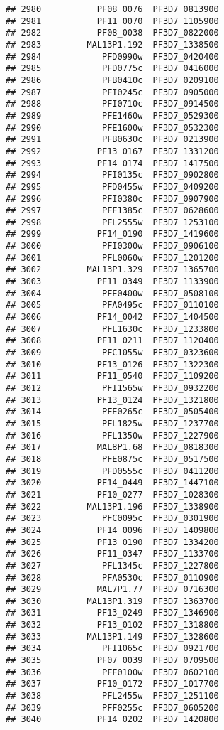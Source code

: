 \documentclass{article}\usepackage[]{graphicx}\usepackage[]{color}
\makeatletter
\newenvironment{kframe}{%
 \def\at@end@of@kframe{}%
 \ifinner\ifhmode%
  \def\at@end@of@kframe{\end{minipage}}%
  \begin{minipage}{\columnwidth}%
 \fi\fi%
 \def\FrameCommand##1{\hskip\@totalleftmargin \hskip-\fboxsep
 \colorbox{shadecolor}{##1}\hskip-\fboxsep
     \hskip-\linewidth \hskip-\@totalleftmargin \hskip\columnwidth}%
 \MakeFramed {\advance\hsize-\width
   \@totalleftmargin\z@ \linewidth\hsize
   \@setminipage}}%
 {\par\unskip\endMakeFramed%
 \at@end@of@kframe}
\newenvironment{knitrout}{}{} %
\makeatother
\begin{document}
\begin{knitrout}
\begin{kframe}
\begin{verbatim}
## 2980           PF08_0076  PF3D7_0813900
## 2981           PF11_0070  PF3D7_1105900
## 2982           PF08_0038  PF3D7_0822000
## 2983         MAL13P1.192  PF3D7_1338500
## 2984            PFD0990w  PF3D7_0420400
## 2985            PFD0775c  PF3D7_0416000
## 2986            PFB0410c  PF3D7_0209100
## 2987            PFI0245c  PF3D7_0905000
## 2988            PFI0710c  PF3D7_0914500
## 2989            PFE1460w  PF3D7_0529300
## 2990            PFE1600w  PF3D7_0532300
## 2991            PFB0630c  PF3D7_0213900
## 2992           PF13_0167  PF3D7_1331200
## 2993           PF14_0174  PF3D7_1417500
## 2994            PFI0135c  PF3D7_0902800
## 2995            PFD0455w  PF3D7_0409200
## 2996            PFI0380c  PF3D7_0907900
## 2997            PFF1385c  PF3D7_0628600
## 2998            PFL2555w  PF3D7_1253100
## 2999           PF14_0190  PF3D7_1419600
## 3000            PFI0300w  PF3D7_0906100
## 3001            PFL0060w  PF3D7_1201200
## 3002         MAL13P1.329  PF3D7_1365700
## 3003           PF11_0349  PF3D7_1133900
## 3004            PFE0400w  PF3D7_0508100
## 3005            PFA0495c  PF3D7_0110100
## 3006           PF14_0042  PF3D7_1404500
## 3007            PFL1630c  PF3D7_1233800
## 3008           PF11_0211  PF3D7_1120400
## 3009            PFC1055w  PF3D7_0323600
## 3010           PF13_0126  PF3D7_1322300
## 3011           PF11_0540  PF3D7_1109200
## 3012            PFI1565w  PF3D7_0932200
## 3013           PF13_0124  PF3D7_1321800
## 3014            PFE0265c  PF3D7_0505400
## 3015            PFL1825w  PF3D7_1237700
## 3016            PFL1350w  PF3D7_1227900
## 3017           MAL8P1.68  PF3D7_0818300
## 3018            PFE0875c  PF3D7_0517500
## 3019            PFD0555c  PF3D7_0411200
## 3020           PF14_0449  PF3D7_1447100
## 3021           PF10_0277  PF3D7_1028300
## 3022         MAL13P1.196  PF3D7_1338900
## 3023            PFC0095c  PF3D7_0301900
## 3024           PF14_0096  PF3D7_1409800
## 3025           PF13_0190  PF3D7_1334200
## 3026           PF11_0347  PF3D7_1133700
## 3027            PFL1345c  PF3D7_1227800
## 3028            PFA0530c  PF3D7_0110900
## 3029           MAL7P1.77  PF3D7_0716300
## 3030         MAL13P1.319  PF3D7_1363700
## 3031           PF13_0249  PF3D7_1346900
## 3032           PF13_0102  PF3D7_1318800
## 3033         MAL13P1.149  PF3D7_1328600
## 3034            PFI1065c  PF3D7_0921700
## 3035           PF07_0039  PF3D7_0709500
## 3036            PFF0100w  PF3D7_0602100
## 3037           PF10_0172  PF3D7_1017700
## 3038            PFL2455w  PF3D7_1251100
## 3039            PFF0255c  PF3D7_0605200
## 3040           PF14_0202  PF3D7_1420800

\end{verbatim}
\end{kframe}
\end{knitrout}
\end{document}
